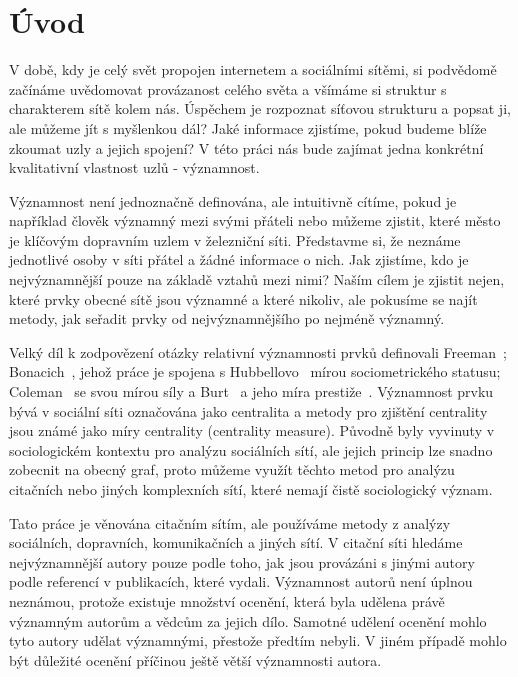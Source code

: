\documentclass{bakalarka}
\begin{document}

\clearpage
\pagestyle{empty}
\setlength{\cftbeforetoctitleskip}{-2em}
\tableofcontents

\clearpage
\setcounter{page}{1}
\pagestyle{fancy}
\chapter{Úvod}
V době, kdy je celý svět propojen internetem a sociálními sítěmi, si podvědomě
začínáme uvědomovat provázanost celého světa a všímáme si struktur s
charakterem sítě kolem nás. Úspěchem je rozpoznat síťovou strukturu a popsat
ji, ale můžeme jít s myšlenkou dál? Jaké informace zjistíme, pokud budeme blíže
zkoumat uzly a jejich spojení? V této práci nás bude zajímat jedna konkrétní
kvalitativní vlastnost uzlů - významnost.

Významnost není jednoznačně definována, ale intuitivně cítíme, pokud je
například člověk významný mezi svými přáteli nebo můžeme zjistit, které město
je klíčovým dopravním uzlem v železniční síti.  Představme si, že neznáme
jednotlivé osoby v síti přátel a žádné informace o nich. Jak zjistíme, kdo je
nejvýznamnější pouze na základě vztahů mezi nimi? Naším cílem je zjistit nejen,
které prvky obecné sítě jsou významné a které nikoliv, ale pokusíme se najít
metody, jak seřadit prvky od nejvýznamnějšího po nejméně významný.

Velký díl k zodpovězení otázky relativní významnosti prvků definovali
Freeman~\citep{freeman1979}; Bonacich~\citep{bonacich1972}, jehož práce je
spojena s Hubbellovo~\citep{hubbell1965} mírou sociometrického statusu;
Coleman~\citep{coleman1973} se svou mírou síly a Burt~\citep{burt1982} a jeho
míra prestiže~\citep{friedkin1991}. Významnost prvku bývá v sociální síti
označována jako centralita a metody pro zjištění centrality jsou známé jako
míry centrality (centrality measure). Původně byly vyvinuty v sociologickém
kontextu pro analýzu sociálních sítí, ale jejich princip lze snadno zobecnit na
obecný graf, proto můžeme využít těchto metod pro analýzu citačních nebo jiných
komplexních sítí, které nemají čistě sociologický význam.

Tato práce je věnována citačním sítím, ale používáme metody z analýzy
sociálních, dopravních, komunikačních a jiných sítí. V citační síti hledáme
nejvýznamnější autory pouze podle toho, jak jsou provázáni s jinými autory
podle referencí v publikacích, které vydali. Významnost autorů není úplnou
neznámou, protože existuje množství ocenění, která byla udělena právě významným
autorům a vědcům za jejich dílo. Samotné udělení ocenění mohlo tyto autory
udělat významnými, přestože předtím nebyli. V jiném případě mohlo být důležité
ocenění příčinou ještě větší významnosti autora. 
\end{document}
